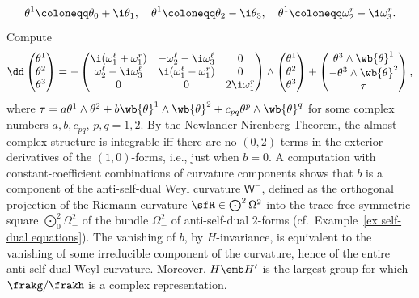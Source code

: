\begin{example}
    \[\theta^1\coloneqq \theta_0+\i\theta_1, \quad \theta^1\coloneqq \theta_2-\i\theta_3, \quad\theta^1\coloneqq \omega^r_2-\i\omega_3^r.\] 
    Compute 
    \[\dd\begin{pmatrix}
        \theta^1\\\theta^2\\\theta^3
    \end{pmatrix}=
    -\begin{pmatrix}
        \i (\omega^\ell_1+\omega^r_1) & -\omega^\ell_2-\i\omega^\ell_3 & 0\\
        \omega^\ell_2-\i \omega^\ell_3 & \i(\omega^\ell_1-\omega^r_1) & 0\\
        0 & 0 & 2\i \omega^r_1
    \end{pmatrix}\wedge 
    \begin{pmatrix}
        \theta^1\\\theta^2\\\theta^3
    \end{pmatrix}
    +\begin{pmatrix}
        \theta^3\wedge \wb{\theta}^1\\
        -\theta^3\wedge\wb{\theta}^2\\
        \tau
    \end{pmatrix},
    \]
    where $\tau=a\theta^1\wedge \theta^2+b\wb{\theta}^1\wedge\wb{\theta}^2+c_{pq}\theta^p\wedge\wb{\theta}^q$ for some complex numbers $a,b,c_{pq}$, $p,q=1,2$. By the Newlander-Nirenberg Theorem, the almost complex structure is integrable iff there are no $(0,2)$ terms in the exterior derivatives of the $(1,0)$-forms, i.e., just when $b=0$. A computation with constant-coefficient combinations of curvature components shows that $b$ is a component of the anti-self-dual Weyl curvature $\mathsf{W}^-$, defined as the orthogonal projection of the Riemann curvature $\sfR\in \bigodot^2\Omega^2$ into the trace-free symmetric square $\bigodot^2_0\Omega^2_-$ of the bundle $\Omega^2_-$ of anti-self-dual $2$-forms (cf.\ Example~\ref{ex self-dual equations}). The vanishing of $b$, by $H$-invariance, is equivalent to the vanishing of some irreducible component of the curvature, hence of the entire anti-self-dual Weyl curvature. Moreover, $H\emb H'$ is the largest group for which $\frakg\slash\frakh$ is a complex representation. 
    

\end{example}
